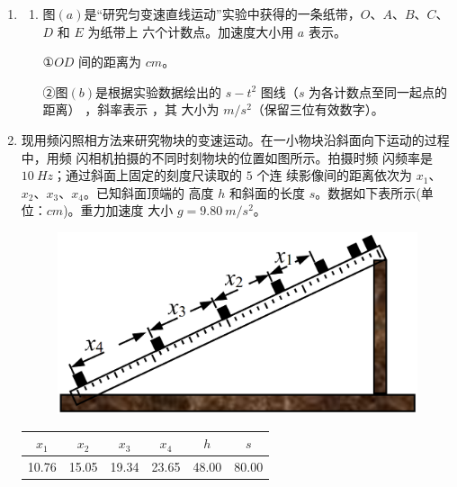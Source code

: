 \begin{enumerate}
\begin{enumerate}
\end{enumerate}



\newpage
\item
{}
\begin{enumerate}
\renewcommand{\labelenumi}{\arabic{enumi}.}
\item
图$ (a) $是“研究匀变速直线运动”实验中获得的一条纸带，$ O $、$ A $、$ B $、$ C $、$ D $ 和 $ E $ 为纸带上
六个计数点。加速度大小用 $ a $ 表示。

①$ OD $ 间的距离为  $ cm $。

②图$ (b) $是根据实验数据绘出的 $ s- t^{2} $ 图线（$ s $ 为各计数点至同一起点的距离）
，斜率表示  ，其
大小为  $ m/s^{2} $（保留三位有效数字）。


\end{enumerate}
\begin{figure}[h!]
\centering 

\end{figure}

\banswer{

}



\item
{}
现用频闪照相方法来研究物块的变速运动。在一小物块沿斜面向下运动的过程中，用频
闪相机拍摄的不同时刻物块的位置如图所示。拍摄时频
闪频率是 $ 10 \ Hz $；通过斜面上固定的刻度尺读取的 $ 5 $ 个连
续影像间的距离依次为 $ x_{1} $、$ x_{2} $、$ x_{3} $、$ x_{4} $。已知斜面顶端的
高度 $ h $ 和斜面的长度 $ s $。数据如下表所示(单位：$ cm $)。重力加速度
大小 $ g=9.80 \ m/s^{2} $。
\begin{figure}[h!]
\centering
\includegraphics[width=0.43\linewidth]{picture/screenshot030}
\end{figure}




\begin{table}[h!]
\centering 
\begin{tabular}{|c|c|c|c|c|c|}
\hline$x_{1}$ & $x_{2}$ & $x_{3}$ & $x_{4}$ & $h$ & $s$ \\
\hline 10.76 & 15.05 & 19.34 & 23.65 & 48.00 & 80.00 \\
\hline
\end{tabular}
\end{table} 



\end{enumerate}

